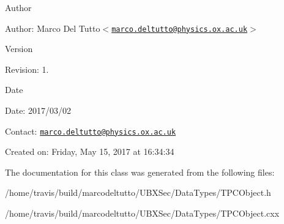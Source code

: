 \begin{DoxyAuthor}{\-Author}

\end{DoxyAuthor}
\begin{DoxyParagraph}{\-Author\-:}
\-Marco \-Del \-Tutto$<$\href{mailto:marco.deltutto@physics.ox.ac.uk}{\tt marco.\-deltutto@physics.\-ox.\-ac.\-uk}$>$ 
\end{DoxyParagraph}


\begin{DoxyVersion}{\-Version}

\end{DoxyVersion}
\begin{DoxyParagraph}{\-Revision\-:}
1. 
\end{DoxyParagraph}


\begin{DoxyDate}{\-Date}

\end{DoxyDate}
\begin{DoxyParagraph}{\-Date\-:}
2017/03/02 
\end{DoxyParagraph}


\-Contact\-: \href{mailto:marco.deltutto@physics.ox.ac.uk}{\tt marco.\-deltutto@physics.\-ox.\-ac.\-uk}

\-Created on\-: \-Friday, \-May 15, 2017 at 16\-:34\-:34 

\-The documentation for this class was generated from the following files\-:\begin{DoxyCompactItemize}
\item 
/home/travis/build/marcodeltutto/\-U\-B\-X\-Sec/\-Data\-Types/\-T\-P\-C\-Object.\-h\item 
/home/travis/build/marcodeltutto/\-U\-B\-X\-Sec/\-Data\-Types/\-T\-P\-C\-Object.\-cxx\end{DoxyCompactItemize}
